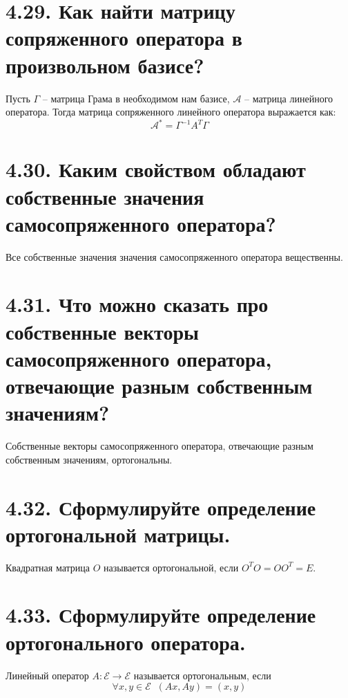 \documentclass{article}
\begin{document}
\section*{\LARGE 4.29. Как найти матрицу сопряженного оператора в произвольном базисе?}
Пусть $\Gamma$ -- матрица Грама в необходимом нам базисе, $\mathcal{A}$ -- матрица линейного оператора. Тогда матрица сопряженного линейного оператора выражается как:
$$
\mathcal{A}^* = \Gamma^{-1}A^T\Gamma
$$

\section*{\LARGE 4.30. Каким свойством обладают собственные значения самосопряженного оператора?}
Все собственные значения значения самосопряженного оператора вещественны.

\section*{\LARGE 4.31. Что можно сказать про собственные векторы самосопряженного оператора, отвечающие разным собственным значениям?}
Собственные векторы самосопряженного оператора, отвечающие разным собственным значениям, ортогональны.

\section*{\LARGE 4.32. Сформулируйте определение ортогональной матрицы.}
Квадратная матрица $O$ называется ортогональной, если $O^TO = OO^T = E$.

\section*{\LARGE 4.33. Сформулируйте определение ортогонального оператора.}
Линейный оператор $A : \mathcal{E} \rightarrow \mathcal{E}$ называется ортогональным, если $$\forall x,y \in \mathcal{E}\;\; (Ax, Ay) = (x, y)$$
\end{document}

